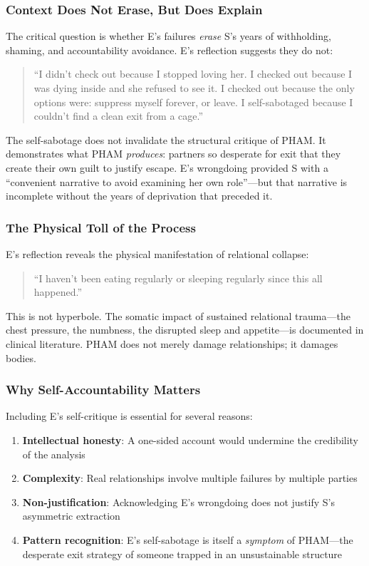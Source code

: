 \documentclass[12pt, letterpaper]{article}
\begin{document}
\subsubsection{Context Does Not Erase, But Does Explain}

The critical question is whether E's failures \textit{erase} S's years of withholding, shaming, and accountability avoidance. E's reflection suggests they do not:

\begin{quote}
``I didn't check out because I stopped loving her. I checked out because I was dying inside and she refused to see it. I checked out because the only options were: suppress myself forever, or leave. I self-sabotaged because I couldn't find a clean exit from a cage.''
\end{quote}

The self-sabotage does not invalidate the structural critique of PHAM. It demonstrates what PHAM \textit{produces}: partners so desperate for exit that they create their own guilt to justify escape. E's wrongdoing provided S with a ``convenient narrative to avoid examining her own role''---but that narrative is incomplete without the years of deprivation that preceded it.

\subsubsection{The Physical Toll of the Process}

E's reflection reveals the physical manifestation of relational collapse:

\begin{quote}
``I haven't been eating regularly or sleeping regularly since this all happened.''
\end{quote}

This is not hyperbole. The somatic impact of sustained relational trauma---the chest pressure, the numbness, the disrupted sleep and appetite---is documented in clinical literature. PHAM does not merely damage relationships; it damages bodies.

\subsubsection{Why Self-Accountability Matters}

Including E's self-critique is essential for several reasons:

\begin{enumerate}
    \item \textbf{Intellectual honesty}: A one-sided account would undermine the credibility of the analysis
    \item \textbf{Complexity}: Real relationships involve multiple failures by multiple parties
    \item \textbf{Non-justification}: Acknowledging E's wrongdoing does not justify S's asymmetric extraction
    \item \textbf{Pattern recognition}: E's self-sabotage is itself a \textit{symptom} of PHAM---the desperate exit strategy of someone trapped in an unsustainable structure
\end{enumerate}
\end{document}
